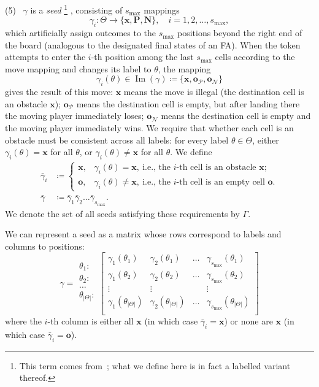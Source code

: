 \documentclass[11pt]{article}
\theoremstyle{definition}
\theoremstyle{plain}
\newcommand{\varP}{\mathcal{P}}
\newcommand{\varN}{\mathcal{N}}
\newcommand{\rmP}{\mathbf{P}}
\newcommand{\rmN}{\mathbf{N}}
\newcommand{\x}{\mathbf{x}}
\newcommand{\e}{\mathbf{o}}
\begin{document}
(5)~ $\gamma$ is a \textit{seed}
\footnote{This term comes from~\cite{Kotzig2019}; what we define here is in fact a labelled variant thereof.}
, consisting of $s_{\max}$ mappings
\[
    \gamma_i: \varTheta \rightarrow \{\x, \rmP, \rmN\},\quad i=1,2,\ldots,s_{\max},
\]
which artificially assign outcomes to the $s_{\max}$ positions beyond the right end of the board (analogous to the designated final states of an FA).
When the token attempts to enter the $i$-th position among the last $s_{\max}$ cells according to the move mapping and changes its label to $\theta$, the mapping
\[
    \gamma_i(\theta) \in \operatorname{Im}(\gamma) \coloneq \{\x, \e_{\varP}, \e_{\varN}\}
\]
gives the result of this move:
$\x$ means the move is illegal (the destination cell is an obstacle $\x$); $\e_{\varP}$ means the destination cell is empty, but after landing there the moving player immediately loses; $\e_{\varN}$ means the destination cell is empty and the moving player immediately wins.
We require that whether each cell is an obstacle must be consistent across all labels: for every label $\theta\in\varTheta$,
either $\gamma_i(\theta)=\x$ for all $\theta$, or $\gamma_i(\theta)\neq\x$ for all $\theta$.
We define
\begin{align*}
    \bar{\gamma}_i & \coloneq
    \begin{cases}
        \x, & \gamma_i(\theta)=\x,\ \text{i.e., the $i$-th cell is an obstacle }\x; \\
        \e, & \gamma_i(\theta)\neq\x,\ \text{i.e., the $i$-th cell is an empty cell }\e.
    \end{cases}\\
    \bar{\gamma} & \coloneq \bar{\gamma}_1\bar{\gamma}_2\ldots \bar{\gamma}_{s_{\max}}.
\end{align*}
We denote the set of all seeds satisfying these requirements by $\varGamma$.

We can represent a seed as a matrix whose rows correspond to labels and columns to positions:
\[
    \gamma =
    \begin{matrix}
        \theta_1 : \\
        \theta_2 : \\
        \ldots \\
        \theta_{|\varTheta|}: \\
    \end{matrix}
    \begin{bmatrix}
        \gamma_1(\theta_1) & \gamma_2(\theta_1) & \ldots & \gamma_{s_{\max}}(\theta_1) \\
        \gamma_1(\theta_2) & \gamma_2(\theta_2) & \ldots & \gamma_{s_{\max}}(\theta_2) \\
        \vdots & \vdots & & \vdots \\
        \gamma_1(\theta_{|\varTheta|}) & \gamma_2(\theta_{|\varTheta|}) & \ldots & \gamma_{s_{\max}}(\theta_{|\varTheta|}) \\
    \end{bmatrix}
\]
where the $i$-th column is either all $\x$ (in which case $\bar{\gamma}_i=\x$) or none are $\x$ (in which case $\bar{\gamma}_i=\e$).
\end{document}
